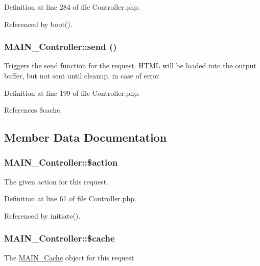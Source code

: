 Definition at line 284 of file Controller.php.

Referenced by boot().\hypertarget{classMAIN__Controller_a940555212e44afb717f9c11e9b6424d8}{
\subsubsection[{send}]{\setlength{\rightskip}{0pt plus 5cm}MAIN\_\-Controller::send ()}}
\label{d0/d6f/classMAIN__Controller_a940555212e44afb717f9c11e9b6424d8}
Triggers the send function for the request. HTML will be loaded into the output buffer, but not sent until cleanup, in case of error. 

Definition at line 199 of file Controller.php.

References \$cache.

\subsection{Member Data Documentation}
\hypertarget{classMAIN__Controller_a586f25bf8bda47c77b6a66a5f2d0d68f}{
\subsubsection[{\$action}]{\setlength{\rightskip}{0pt plus 5cm}MAIN\_\-Controller::\$action}}
\label{d0/d6f/classMAIN__Controller_a586f25bf8bda47c77b6a66a5f2d0d68f}
The given action for this request. 

Definition at line 61 of file Controller.php.

Referenced by initiate().\hypertarget{classMAIN__Controller_ad9dbd5184b193cbea96bd88eadd88059}{
\subsubsection[{\$cache}]{\setlength{\rightskip}{0pt plus 5cm}MAIN\_\-Controller::\$cache}}
\label{d0/d6f/classMAIN__Controller_ad9dbd5184b193cbea96bd88eadd88059}
The \hyperlink{classMAIN__Cache}{MAIN\_\-Cache} object for this request 

